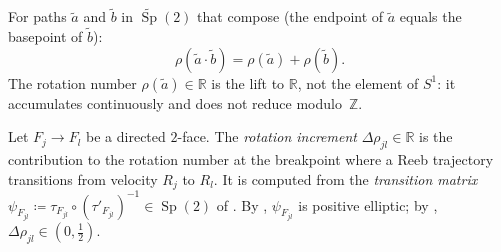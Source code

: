 \begin{remark}\label{rem:rotation-additivity}
For paths $\tilde{a}$ and $\tilde{b}$ in $\widetilde{\operatorname{Sp}}(2)$
that compose (the endpoint of $\tilde{a}$ equals the basepoint of $\tilde{b}$):
\begin{equation}\label{eq:rotation-additivity}
  \rho(\tilde{a} \cdot \tilde{b}) = \rho(\tilde{a}) + \rho(\tilde{b}).
\end{equation}
The rotation number $\rho(\tilde{a}) \in \mathbb{R}$ is
the lift to $\mathbb{R}$, not the element of $S^1$:
it accumulates continuously and does not reduce modulo~$\mathbb{Z}$.
\end{remark}

\begin{definition}\label{def:rotation-increment}
Let $F_j \to F_l$ be a directed $2$-face.
The \emph{rotation increment} $\Delta\rho_{jl} \in \mathbb{R}$
is the contribution to the rotation number at the breakpoint
where a Reeb trajectory transitions from velocity $R_j$ to $R_l$.
It is computed from the \emph{transition matrix}
$\psi_{F_{jl}} \coloneqq \tau_{F_{jl}} \circ (\tau'_{F_{jl}})^{-1} \in \operatorname{Sp}(2)$
of \cite[Def.~2.20]{CH2021}.
By \cite[Lem.~2.21]{CH2021}, $\psi_{F_{jl}}$ is positive elliptic;
by \cite[Cor.~2.22]{CH2021}, $\Delta\rho_{jl} \in (0, \tfrac{1}{2})$.
\end{definition}

